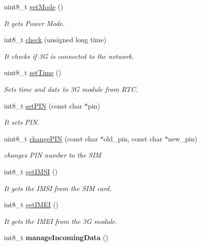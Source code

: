\begin{DoxyCompactItemize}
uint8\+\_\+t \hyperlink{class_wasp3_g_af771817158fe64b3dc11b8917f6c9744}{get\+Mode} ()
\begin{DoxyCompactList}\small\item\em It gets Power Mode. \end{DoxyCompactList}\item 
int8\+\_\+t \hyperlink{class_wasp3_g_aa1936925d6133cebd95ddb40092ef9c0}{check} (unsigned long time)
\begin{DoxyCompactList}\small\item\em It checks if 3G is connected to the network. \end{DoxyCompactList}\item 
uint8\+\_\+t \hyperlink{class_wasp3_g_aa668a2ff5ec27d797fca439574e217f7}{set\+Time} ()
\begin{DoxyCompactList}\small\item\em Sets time and date to 3G module from R\+TC. \end{DoxyCompactList}\item 
int8\+\_\+t \hyperlink{class_wasp3_g_a2ccdfd541908ff9d8890595ccf6dff1f}{set\+P\+IN} (const char $\ast$pin)
\begin{DoxyCompactList}\small\item\em It sets P\+IN. \end{DoxyCompactList}\item 
uint8\+\_\+t \hyperlink{class_wasp3_g_aedbb3a2e425bae03eea7e749464dbc1d}{change\+P\+IN} (const char $\ast$old\+\_\+pin, const char $\ast$new\+\_\+pin)
\begin{DoxyCompactList}\small\item\em changes P\+IN number to the S\+IM \end{DoxyCompactList}\item 
int8\+\_\+t \hyperlink{class_wasp3_g_a85362586370979037324d359fdd82820}{get\+I\+M\+SI} ()
\begin{DoxyCompactList}\small\item\em It gets the I\+M\+SI from the S\+IM card. \end{DoxyCompactList}\item 
int8\+\_\+t \hyperlink{class_wasp3_g_a73ae88995d39f1858002094a9aef84f8}{get\+I\+M\+EI} ()
\begin{DoxyCompactList}\small\item\em It gets the I\+M\+EI from the 3G module. \end{DoxyCompactList}\item 
int8\+\_\+t {\bfseries manage\+Incoming\+Data} ()\hypertarget{class_wasp3_g_a07a101f4385bd5e24a4e29e5351f1bb6}{}\label{class_wasp3_g_a07a101f4385bd5e24a4e29e5351f1bb6}


\end{DoxyCompactItemize}
